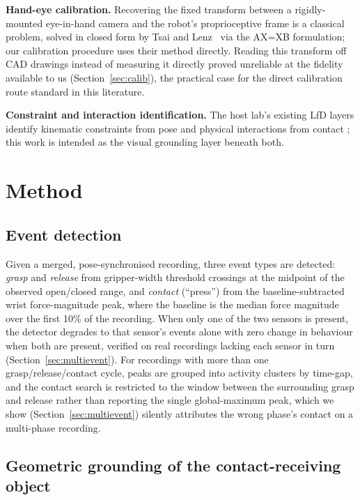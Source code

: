 \documentclass[letterpaper, 10pt, journal, twoside]{IEEEtran}
\begin{document}
\textbf{Hand-eye calibration.} Recovering the fixed transform between a
rigidly-mounted eye-in-hand camera and the robot's proprioceptive frame
is a classical problem, solved in closed form by Tsai and
Lenz~\cite{tsai1989handeye} via the AX=XB formulation; our calibration
procedure uses their method directly. Reading this transform off CAD
drawings instead of measuring it directly proved unreliable at the
fidelity available to us (Section~\ref{sec:calib}), the practical case
for the direct calibration route standard in this literature.

\textbf{Constraint and interaction identification.} The host lab's
existing LfD layers identify kinematic constraints from pose
\cite{overbeek2025frontiers} and physical interactions from contact
\cite{overbeek2025adrr}; this work is intended as the visual grounding
layer beneath both.

\section{Method}
\label{sec:method}

\subsection{Event detection}

Given a merged, pose-synchronised recording, three event types are
detected: \emph{grasp} and \emph{release} from gripper-width threshold
crossings at the midpoint of the observed open/closed range, and
\emph{contact} (``press'') from the baseline-subtracted wrist
force-magnitude peak, where the baseline is the median force magnitude
over the first 10\% of the recording. When only one of the two sensors is
present, the detector degrades to that sensor's events alone with zero
change in behaviour when both are present, verified on real recordings
lacking each sensor in turn (Section~\ref{sec:multievent}). For
recordings with more than one grasp/release/contact cycle, peaks are
grouped into activity clusters by time-gap, and the contact search is
restricted to the window between the surrounding grasp and release
rather than reporting the single global-maximum peak, which we show
(Section~\ref{sec:multievent}) silently attributes the wrong phase's
contact on a multi-phase recording.

\subsection{Geometric grounding of the contact-receiving object}
\end{document}
